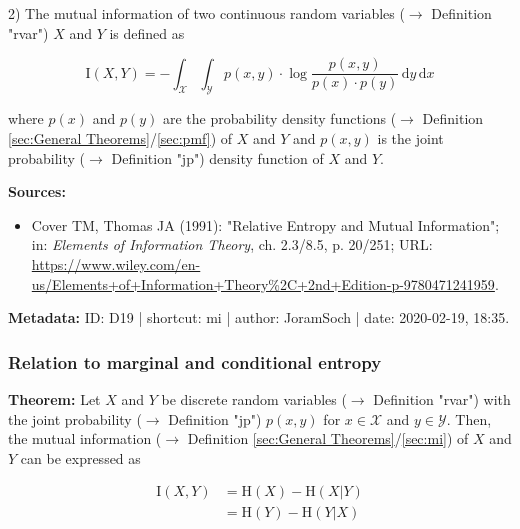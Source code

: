 \documentclass[a4paper,12pt]{book}
\begin{document}
2) The mutual information of two continuous random variables ($\rightarrow$ Definition "rvar") $X$ and $Y$ is defined as

\begin{equation} \label{eq:mi-mi-cont}
\mathrm{I}(X,Y) = - \int_{\mathcal{X}} \int_{\mathcal{Y}} p(x,y) \cdot \log \frac{p(x,y)}{p(x) \cdot p(y)} \, \mathrm{d}y \, \mathrm{d}x
\end{equation}

where $p(x)$ and $p(y)$ are the probability density functions ($\rightarrow$ Definition \ref{sec:General Theorems}/\ref{sec:pmf}) of $X$ and $Y$ and $p(x,y)$ is the joint probability ($\rightarrow$ Definition "jp") density function of $X$ and $Y$.

\vspace{1em}
\textbf{Sources:}
\begin{itemize}
\item Cover TM, Thomas JA (1991): "Relative Entropy and Mutual Information"; in: \textit{Elements of Information Theory}, ch. 2.3/8.5, p. 20/251; URL: \url{https://www.wiley.com/en-us/Elements+of+Information+Theory%2C+2nd+Edition-p-9780471241959}.
\end{itemize}


\vspace{1em}
\textbf{Metadata:} ID: D19 | shortcut: mi | author: JoramSoch | date: 2020-02-19, 18:35.


\subsubsection[\textbf{Relation to marginal and conditional entropy}]{Relation to marginal and conditional entropy} \label{sec:dmi-mce}

\vspace{1em}
\textbf{Theorem:} Let $X$ and $Y$ be discrete random variables ($\rightarrow$ Definition "rvar") with the joint probability ($\rightarrow$ Definition "jp") $p(x,y)$ for $x \in \mathcal{X}$ and $y \in \mathcal{Y}$. Then, the mutual information ($\rightarrow$ Definition \ref{sec:General Theorems}/\ref{sec:mi}) of $X$ and $Y$ can be expressed as

\begin{equation} \label{eq:dmi-mce-dmi-mce}
\begin{split}
\mathrm{I}(X,Y) &= \mathrm{H}(X) - \mathrm{H}(X|Y) \\
&= \mathrm{H}(Y) - \mathrm{H}(Y|X)
\end{split}
\end{equation}
\end{document}
